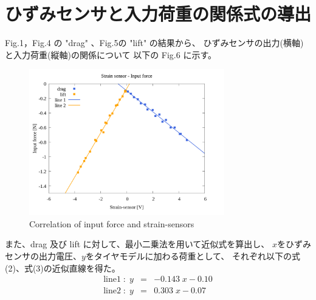 \documentclass[twocolumn,a4j]{jsarticle}
\begin{document}
\section{ひずみセンサと入力荷重の関係式の導出}
Fig.1，Fig.4 の "drag" 、Fig.5の "lift" の結果から、
ひずみセンサの出力(横軸)と入力荷重(縦軸)の関係について
以下の Fig.6 に示す。\par
\begin{figure}[htbp]
    \footnotesize
    \begin{center}
        \includegraphics[width=85mm]{../images/08_strainsensor-forces&line.png}
        \caption{Correlation of input force and strain-sensors}
    \end{center}
\end{figure}
また、drag 及び lift に対して、最小二乗法を用いて近似式を算出し、
$x$をひずみセンサの出力電圧、$y$をタイヤモデルに加わる荷重として、
それぞれ以下の式(2)、式(3)の近似直線を得た。
\begin{eqnarray}
    \mathrm{line 1} \; : \; y &=& -0.143 \; x - 0.10\\
    \mathrm{line 2} \; : \; y &=& 0.303 \; x - 0.07
\end{eqnarray}
\end{document}
